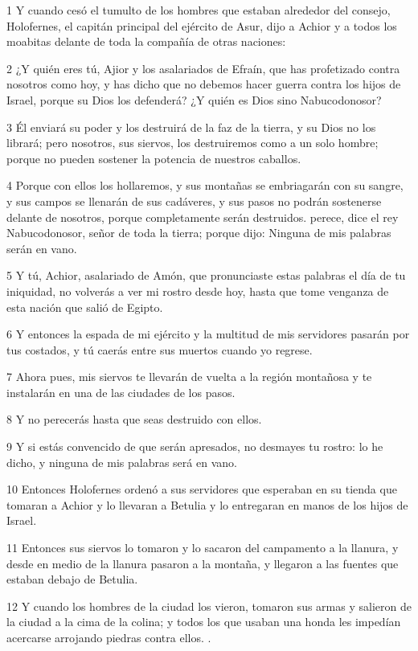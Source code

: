 \par 1 Y cuando cesó el tumulto de los hombres que estaban alrededor del consejo, Holofernes, el capitán principal del ejército de Asur, dijo a Achior y a todos los moabitas delante de toda la compañía de otras naciones:
\par 2 ¿Y quién eres tú, Ajior y los asalariados de Efraín, que has profetizado contra nosotros como hoy, y has dicho que no debemos hacer guerra contra los hijos de Israel, porque su Dios los defenderá? ¿Y quién es Dios sino Nabucodonosor?
\par 3 Él enviará su poder y los destruirá de la faz de la tierra, y su Dios no los librará; pero nosotros, sus siervos, los destruiremos como a un solo hombre; porque no pueden sostener la potencia de nuestros caballos.
\par 4 Porque con ellos los hollaremos, y sus montañas se embriagarán con su sangre, y sus campos se llenarán de sus cadáveres, y sus pasos no podrán sostenerse delante de nosotros, porque completamente serán destruidos. perece, dice el rey Nabucodonosor, señor de toda la tierra; porque dijo: Ninguna de mis palabras serán en vano.
\par 5 Y tú, Achior, asalariado de Amón, que pronunciaste estas palabras el día de tu iniquidad, no volverás a ver mi rostro desde hoy, hasta que tome venganza de esta nación que salió de Egipto.
\par 6 Y entonces la espada de mi ejército y la multitud de mis servidores pasarán por tus costados, y tú caerás entre sus muertos cuando yo regrese.
\par 7 Ahora pues, mis siervos te llevarán de vuelta a la región montañosa y te instalarán en una de las ciudades de los pasos.
\par 8 Y no perecerás hasta que seas destruido con ellos.
\par 9 Y si estás convencido de que serán apresados, no desmayes tu rostro: lo he dicho, y ninguna de mis palabras será en vano.
\par 10 Entonces Holofernes ordenó a sus servidores que esperaban en su tienda que tomaran a Achior y lo llevaran a Betulia y lo entregaran en manos de los hijos de Israel.
\par 11 Entonces sus siervos lo tomaron y lo sacaron del campamento a la llanura, y desde en medio de la llanura pasaron a la montaña, y llegaron a las fuentes que estaban debajo de Betulia.
\par 12 Y cuando los hombres de la ciudad los vieron, tomaron sus armas y salieron de la ciudad a la cima de la colina; y todos los que usaban una honda les impedían acercarse arrojando piedras contra ellos. .
